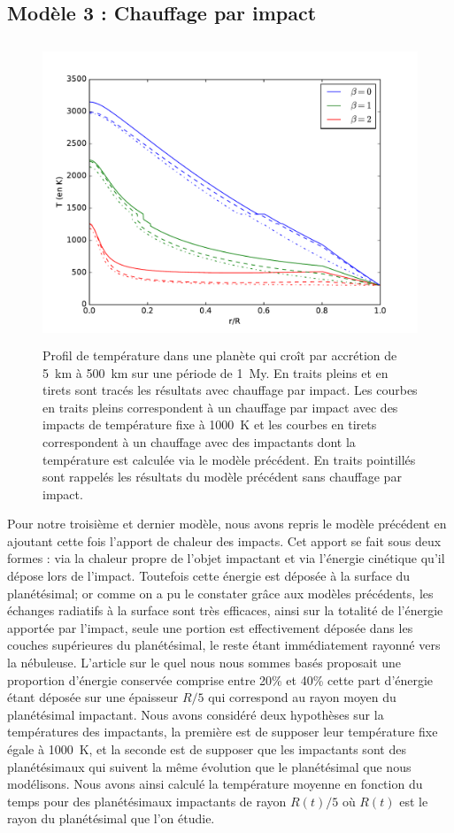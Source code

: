 \documentclass[10pt,a4paper]{article}
\numberwithin{equation}{section}
\begin{document}
\subsection{Modèle 3 : Chauffage par impact}

\begin{figure}[h!]
\centering
\includegraphics[height=9cm]{./figures/graph_sim3.pdf}
\caption{Profil de température dans une planète qui croît par accrétion de \SI{5}{km} à \SI{500}{km} sur une période de \SI{1}{My}. En traits pleins et en tirets sont tracés les résultats avec chauffage par impact. Les courbes en traits pleins correspondent à un chauffage par impact avec des impacts de température fixe à \SI{1000}{K} et les courbes en tirets correspondent à un chauffage avec des impactants dont la température est calculée via le modèle précédent. En traits pointillés sont rappelés les résultats du modèle précédent sans chauffage par impact.}
\label{fig3}
\end{figure}

Pour notre troisième et dernier modèle, nous avons repris le modèle précédent en ajoutant cette fois l'apport de chaleur des impacts. Cet apport se fait sous deux formes : via la chaleur propre de l'objet impactant et via l'énergie cinétique qu'il dépose lors de l'impact. Toutefois cette énergie est déposée à la surface du planétésimal; or comme on a pu le constater grâce aux modèles précédents, les échanges radiatifs à la surface sont très efficaces, ainsi sur la totalité de l'énergie apportée par l'impact, seule une portion est effectivement déposée dans les couches supérieures du planétésimal, le reste étant immédiatement rayonné vers la nébuleuse. L'article sur le quel nous nous sommes basés proposait une proportion d'énergie conservée comprise entre 20\% et 40\% cette part d'énergie étant déposée sur une épaisseur $R/5$ qui correspond au rayon moyen du planétésimal impactant.
Nous avons considéré deux hypothèses sur la températures des impactants, la première est de supposer leur température fixe égale à \SI{1000}{K}, et la seconde est de supposer que les impactants sont des planétésimaux qui suivent la même évolution que le planétésimal que nous modélisons. Nous avons ainsi calculé la température moyenne en fonction du temps pour des planétésimaux impactants de rayon $R(t)/5$ où $R(t)$ est le rayon du planétésimal que l'on étudie.
\end{document}
